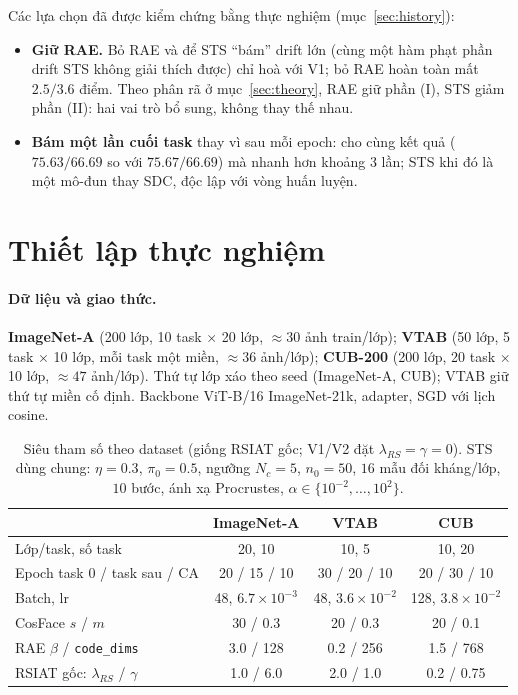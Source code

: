 \documentclass[11pt]{article}
\begin{document}
\medskip
Các lựa chọn đã được kiểm chứng bằng thực nghiệm (mục~\ref{sec:history}):
\begin{itemize}
\item \textbf{Giữ RAE.} Bỏ RAE và để STS ``bám'' drift lớn (cùng một hàm phạt phần drift STS không giải thích được)
chỉ hoà với V1; bỏ RAE hoàn toàn mất $2.5/3.6$ điểm. Theo phân rã ở mục~\ref{sec:theory}, RAE giữ phần (I), STS giảm
phần (II): hai vai trò bổ sung, không thay thế nhau.
\item \textbf{Bám một lần cuối task} thay vì sau mỗi epoch: cho cùng kết quả ($75.63/66.69$ so với $75.67/66.69$) mà
nhanh hơn khoảng $3$ lần; STS khi đó là một mô-đun thay SDC, độc lập với vòng huấn luyện.
\end{itemize}

\section{Thiết lập thực nghiệm}\label{sec:exp}

\paragraph{Dữ liệu và giao thức.}
\textbf{ImageNet-A} (200 lớp, 10 task $\times$ 20 lớp, $\approx30$ ảnh train/lớp);
\textbf{VTAB} (50 lớp, 5 task $\times$ 10 lớp, mỗi task một miền, $\approx36$ ảnh/lớp);
\textbf{CUB-200} (200 lớp, 20 task $\times$ 10 lớp, $\approx47$ ảnh/lớp). Thứ tự lớp xáo theo seed (ImageNet-A, CUB);
VTAB giữ thứ tự miền cố định. Backbone ViT-B/16 ImageNet-21k, adapter, SGD với lịch cosine.

\begin{table}[H]
\centering\small
\caption{Siêu tham số theo dataset (giống RSIAT gốc; V1/V2 đặt $\lambda_{RS}=\gamma=0$). STS dùng chung:
$\eta=0.3$, $\pi_0=0.5$, ngưỡng $N_c=5$, $n_0=50$, $16$ mẫu đối kháng/lớp, $10$ bước, ánh xạ Procrustes,
$\alpha\in\{10^{-2},\dots,10^2\}$.}
\begin{tabular}{lccc}
\toprule
 & ImageNet-A & VTAB & CUB \\
\midrule
Lớp/task, số task & 20, 10 & 10, 5 & 10, 20 \\
Epoch task 0 / task sau / CA & 20 / 15 / 10 & 30 / 20 / 10 & 20 / 30 / 10 \\
Batch, lr & 48, $6.7\!\times\!10^{-3}$ & 48, $3.6\!\times\!10^{-2}$ & 128, $3.8\!\times\!10^{-2}$ \\
CosFace $s$ / $m$ & 30 / 0.3 & 20 / 0.3 & 20 / 0.1 \\
RAE $\beta$ / \texttt{code\_dims} & 3.0 / 128 & 0.2 / 256 & 1.5 / 768 \\
RSIAT gốc: $\lambda_{RS}$ / $\gamma$ & 1.0 / 6.0 & 2.0 / 1.0 & 0.2 / 0.75 \\
\bottomrule
\end{tabular}
\end{table}
\end{document}
